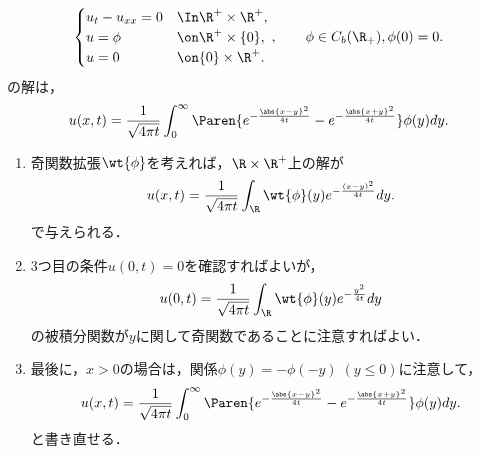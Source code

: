 \documentclass[uplatex,dvipdfmx]{jsreport}
\begin{document}
\begin{proposition}[$\R_+$上の解公式]\label{prop-solution-of-HE-on-R_+}
    \[\begin{cases}
        u_t-u_{xx}=0&\In\R^+\times\R^+,\\
        u=\phi&\on\R^+\times\{0\},\\
        u=0&\on\{0\}\times\R^+.
    \end{cases},\qquad\phi\in C_b(\R_+),\phi(0)=0.\]
    の解は，
    \[u(x,t)=\frac{1}{\sqrt{4\pi t}}\int^\infty_0\Paren{e^{-\frac{\abs{x-y}^2}{4t}}-e^{-\frac{\abs{x+y}^2}{4t}}}\phi(y)dy.\]
\end{proposition}
\begin{Proof}\mbox{}
    \begin{enumerate}[{Step}1]
        \item 奇関数拡張$\wt{\phi}$を考えれば，$\R\times\R^+$上の解が
        \[u(x,t)=\frac{1}{\sqrt{4\pi t}}\int_\R\wt{\phi}(y)e^{-\frac{(x-y)^2}{4t}}dy.\]
        で与えられる．
        \item 3つ目の条件$u(0,t)=0$を確認すればよいが，
        \[u(0,t)=\frac{1}{\sqrt{4\pi t}}\int_\R\wt{\phi}(y)e^{-\frac{y^2}{4t}}dy\]
        の被積分関数が$y$に関して奇関数であることに注意すればよい．
        \item 最後に，$x>0$の場合は，関係$\phi(y)=-\phi(-y)\;(y\le0)$に注意して，
        \[u(x,t)=\frac{1}{\sqrt{4\pi t}}\int^\infty_0\Paren{e^{-\frac{\abs{x-y}^2}{4t}}-e^{-\frac{\abs{x+y}^2}{4t}}}\phi(y)dy.\]
        と書き直せる．
    \end{enumerate}
\end{Proof}
\end{document}
